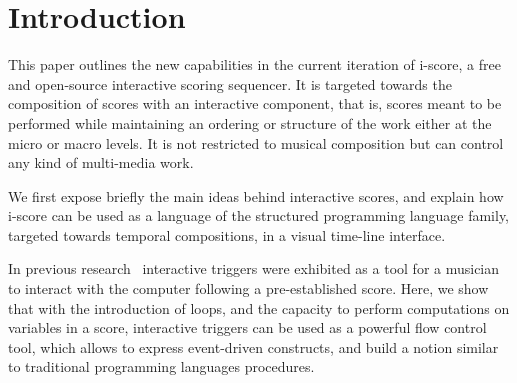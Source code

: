 \documentclass{article}
\title{\papertitle}
\begin{document}
%
\capstartfalse
\maketitle
\capstarttrue
%
\begin{abstract}
     The development and authoring of interactive music or applications, such as user interfaces for arts \& exhibitions
     has traditionally been done with tools that pertain to two broad metaphors. 
     Cue-based environments work by making groups of parameters and sending them to remote devices, 
     while more interactive applications are generally written in generic art-oriented 
     programming environments, such as Max/MSP, Processing or openFrameworks.
     In this paper, we present the current version of the i-score sequencer. 
     It is an extensive graphical software that bridges the gap between time-based, logic-based and flow-based interactive application authoring tools.
     Built upon a few simple and novel primitives that give to the composer the expressive power of structured programming, i-score provides a time line adapted to the notation of parameter-oriented interactive music, 
     and allows temporal scripting using JavaScript. We present the usage of these primitives, as well as an i-score example of work inspired from music based on polyvalent structure.
\end{abstract}
\section{Introduction}\label{sec:introduction}
This paper outlines the new capabilities in the current iteration of i-score, 
a free and open-source interactive scoring sequencer.
It is targeted towards the composition of scores with an interactive component, that is, scores meant to be performed while maintaining an ordering or structure of the work either at the micro or macro levels.
It is not restricted to musical composition but can control any kind of multi-media work.

We first expose briefly the main ideas behind interactive scores, and explain 
how i-score can be used as a language of the structured programming language 
family, targeted towards temporal compositions, in a visual time-line interface.

In previous research~\cite{allombert2006concurrent} interactive triggers 
were exhibited as a tool for a musician to interact with the computer following a pre-established score.
Here, we show that with the introduction of loops, and the capacity to perform computations 
on variables in a score, interactive triggers can be used as a powerful flow control tool, which 
allows to express event-driven constructs, and build a notion similar to traditional programming 
languages procedures.
\end{document}
